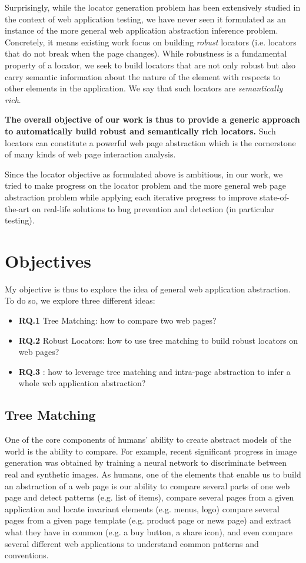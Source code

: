 Surprisingly, while the locator generation problem has been extensively studied in the context of web application testing, we have never seen it formulated as an instance of the more general web application abstraction inference problem.
Concretely, it means existing work focus on building \textit{robust} locators (i.e. locators that do not break when the page changes).
While robustness is a fundamental property of a locator, we seek to build locators that are not only robust but also carry semantic information about the nature of the element with respects to other elements in the application.
We say that such locators are \textit{semantically rich}. 

\textbf{The overall objective of our work is thus to provide a generic approach to automatically build robust and semantically rich locators.}
Such locators can constitute a powerful web page abstraction which is the cornerstone of many kinds of web page interaction analysis.

Since the locator objective as formulated above is ambitious, in our work, we tried to make progress on the locator problem and the more general web page abstraction problem while applying each iterative progress to improve state-of-the-art on real-life solutions to bug prevention and detection (in particular testing).

\section{Objectives}
My objective is thus to explore the idea of general web application abstraction. To do so, we explore three different ideas:
\begin{itemize}[label={}]
\item \textbf{RQ.1 } Tree Matching: how to compare two web pages?
\item \textbf{RQ.2 } Robust Locators: how to use tree matching to build robust locators on web pages?
\item \textbf{RQ.3 } \appstract{}: how to leverage tree matching and intra-page abstraction to infer a whole web application abstraction?
\end{itemize}

\subsection{Tree Matching}
One of the core components of humans' ability to create abstract models of the world is the ability to compare.
For example, recent significant progress in image generation was obtained by training a neural network to discriminate between real and synthetic images. As humans, one of the elements that enable us to build an abstraction of a web page is our ability 
to compare several parts of one web page and detect patterns (e.g. list of items), 
compare several pages from a given application and locate invariant elements (e.g. menus, logo)
compare several pages from a given page template (e.g. product page or news page) and extract what they have in common (e.g. a buy button, a share icon),
and even compare several different web applications to understand common patterns and conventions.

